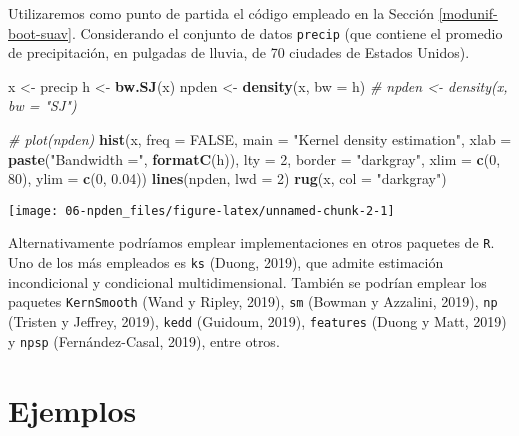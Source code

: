 \documentclass[
]{book}
\newenvironment{Shaded}{\begin{snugshade}}{\end{snugshade}}
\newcommand{\CommentTok}[1]{\textcolor[rgb]{0.56,0.35,0.01}{\textit{#1}}}
\newcommand{\DataTypeTok}[1]{\textcolor[rgb]{0.13,0.29,0.53}{#1}}
\newcommand{\DecValTok}[1]{\textcolor[rgb]{0.00,0.00,0.81}{#1}}
\newcommand{\FloatTok}[1]{\textcolor[rgb]{0.00,0.00,0.81}{#1}}
\newcommand{\KeywordTok}[1]{\textcolor[rgb]{0.13,0.29,0.53}{\textbf{#1}}}
\newcommand{\NormalTok}[1]{#1}
\newcommand{\OtherTok}[1]{\textcolor[rgb]{0.56,0.35,0.01}{#1}}
\newcommand{\StringTok}[1]{\textcolor[rgb]{0.31,0.60,0.02}{#1}}
\theoremstyle{break}
\theoremstyle{definition}
\theoremstyle{definition}
\theoremstyle{definition}
\theoremstyle{remark}
\begin{document}
Utilizaremos como punto de partida el código empleado en la Sección \ref{modunif-boot-suav}.
Considerando el conjunto de datos \texttt{precip} (que contiene el promedio de precipitación,
en pulgadas de lluvia, de 70 ciudades de Estados Unidos).

\begin{Shaded}
\begin{Highlighting}[]
\NormalTok{x <-}\StringTok{ }\NormalTok{precip}
\NormalTok{h <-}\StringTok{ }\KeywordTok{bw.SJ}\NormalTok{(x)}
\NormalTok{npden <-}\StringTok{ }\KeywordTok{density}\NormalTok{(x, }\DataTypeTok{bw =}\NormalTok{ h)}
\CommentTok{# npden <- density(x, bw = "SJ")}

\CommentTok{# plot(npden)}
\KeywordTok{hist}\NormalTok{(x, }\DataTypeTok{freq =} \OtherTok{FALSE}\NormalTok{, }\DataTypeTok{main =} \StringTok{"Kernel density estimation"}\NormalTok{,}
     \DataTypeTok{xlab =} \KeywordTok{paste}\NormalTok{(}\StringTok{"Bandwidth ="}\NormalTok{, }\KeywordTok{formatC}\NormalTok{(h)), }\DataTypeTok{lty =} \DecValTok{2}\NormalTok{,}
     \DataTypeTok{border =} \StringTok{"darkgray"}\NormalTok{, }\DataTypeTok{xlim =} \KeywordTok{c}\NormalTok{(}\DecValTok{0}\NormalTok{, }\DecValTok{80}\NormalTok{), }\DataTypeTok{ylim =} \KeywordTok{c}\NormalTok{(}\DecValTok{0}\NormalTok{, }\FloatTok{0.04}\NormalTok{))}
\KeywordTok{lines}\NormalTok{(npden, }\DataTypeTok{lwd =} \DecValTok{2}\NormalTok{)}
\KeywordTok{rug}\NormalTok{(x, }\DataTypeTok{col =} \StringTok{"darkgray"}\NormalTok{)}
\end{Highlighting}
\end{Shaded}

\begin{center}\texttt{[image: 06-npden\_files/figure-latex/unnamed-chunk-2-1]} \end{center}

Alternativamente podríamos emplear implementaciones en otros paquetes de \texttt{R}.
Uno de los más empleados es \texttt{ks} (Duong, 2019), que admite estimación
incondicional y condicional multidimensional.
También se podrían emplear los paquetes \texttt{KernSmooth} (Wand y Ripley, 2019),
\texttt{sm} (Bowman y Azzalini, 2019), \texttt{np} (Tristen y Jeffrey, 2019),
\texttt{kedd} (Guidoum, 2019), \texttt{features} (Duong y Matt, 2019) y \texttt{npsp} (Fernández-Casal, 2019),
entre otros.

\hypertarget{ejemplos-1}{%
\section{Ejemplos}\label{ejemplos-1}}
\end{document}
